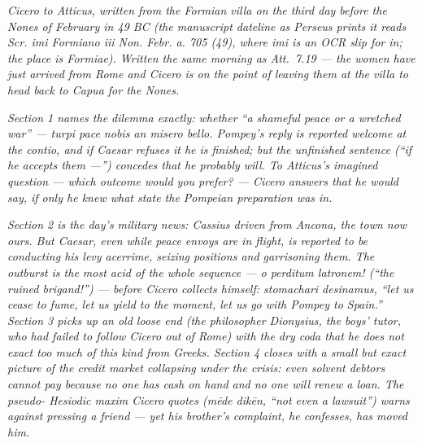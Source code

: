
\textit{Cicero to Atticus, written from the Formian villa
on the third day before the Nones of February in 49 BC
(the manuscript dateline as Perseus prints it reads
\textit{Scr. imi Formiano iii Non. Febr. a. 705 (49)},
where \emph{imi} is an OCR slip for \emph{in}; the place
is Formiae). Written the same morning as Att.~7.19 ---
the women have just arrived from Rome and Cicero is on
the point of leaving them at the villa to head back to
Capua for the Nones.}

\textit{Section 1 names the dilemma exactly: whether
``a shameful peace or a wretched war'' --- \emph{turpi
pace nobis an misero bello}. Pompey's reply is reported
welcome at the contio, and if Caesar refuses it he is
finished; but the unfinished sentence (``if he accepts
them ---'') concedes that he probably will. To Atticus's
imagined question --- which outcome would you prefer? ---
Cicero answers that he would say, if only he knew what
state the Pompeian preparation was in.}

\textit{Section 2 is the day's military news: Cassius
driven from Ancona, the town now ours. But Caesar, even
while peace envoys are in flight, is reported to be
conducting his levy \emph{acerrime}, seizing positions
and garrisoning them. The outburst is the most acid of
the whole sequence --- \emph{o perditum latronem!} (``the
ruined brigand!'') --- before Cicero collects himself:
\emph{stomachari desinamus}, ``let us cease to fume,
let us yield to the moment, let us go with Pompey to
Spain.'' Section 3 picks up an old loose end (the
philosopher Dionysius, the boys' tutor, who had failed
to follow Cicero out of Rome) with the dry coda that he
does not exact too much of this kind from Greeks.
Section 4 closes with a small but exact picture of the
credit market collapsing under the crisis: even
solvent debtors cannot pay because no one has cash on
hand and no one will renew a loan. The \emph{pseudo-
Hesiodic} maxim Cicero quotes (\emph{mēde dikēn}, ``not
even a lawsuit'') warns against pressing a friend ---
yet his brother's complaint, he confesses, has moved
him.}
